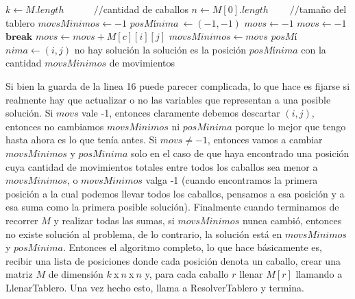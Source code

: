 \documentclass[a4paper]{article}
\begin{document}
\begin{algorithmic}[1]
	\State $k \gets M.length \ \ \ \ \ \ \ \ \ \ \ \ \ \ //$cantidad de caballos
	\State $n \gets M[0].length \ \ \ \ \ \ \ \ \ \ //$tamaño del tablero
	\State $movsMinimos \gets -1$
	\State $posM$í$nima\ \gets (-1, -1)$
	\newline
			\State $movs \gets -1$
				\State $movs \gets -1$
				\State $\textbf{break}$
			\EndIf
			\State $movs \gets movs + M[c][i][j]$
			\EndFor 
				\State $movsMinimos \gets movs$
				\State $posM$í$nima \gets (i, j)$
			\EndIf
		\EndFor
	\EndFor
	\newline
		\State no hay solución
	\Else
		\State la solución es la posición $posM$í$nima$ con la cantidad $movsMinimos$ de movimientos
	\EndIf
	\newline
\EndProcedure
\end{algorithmic}

\vspace{0.5cm}
\noindent Si bien la guarda de la linea 16 puede parecer complicada, lo que hace es fijarse si realmente hay que actualizar o no las variables que representan a una posible solución. Si $movs$ vale -1, entonces claramente debemos descartar $(i, j)$, entonces no cambiamos $movsMinimos$ ni $posMinima$ porque lo mejor que tengo hasta ahora es lo que tenía antes. Si $movs \neq -1$, entonces vamos a cambiar $movsMinimos$ y $posMinima$ solo en el caso de que haya encontrado una posición cuya cantidad de movimientos totales entre todos los caballos sea menor a $movsMinimos$, o $movsMinimos$ valga -1 (cuando encontramos la primera posición a la cual podemos llevar todos los caballos, pensamos a esa posición y a esa suma como la primera posible solución).
\newline Finalmente cuando terminamos de recorrer $M$ y realizar todas las sumas, si $movsMinimos$ nunca cambió, entonces no existe solución al problema, de lo contrario, la solución está en $movsMinimos$ y $posMinima$.
\newline
\newline Entonces el algoritmo completo, lo que hace básicamente es, recibir una lista de posiciones donde cada posición denota un caballo, crear una matriz $M$ de dimensión $k \ $x$\ n \ $x$ \ n$ y, para cada caballo $r$ llenar $M[r]$ llamando a LlenarTablero. Una vez hecho esto, llama a ResolverTablero y termina.
\end{document}
